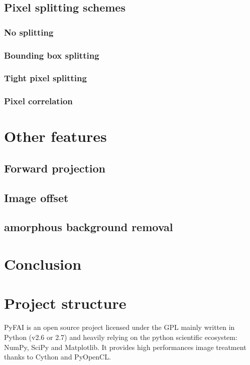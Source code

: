\documentclass[preprint]{iucr}
\begin{document}
\subsection{Pixel splitting schemes}
\subsubsection{No splitting}
\subsubsection{Bounding box splitting}
\subsubsection{Tight pixel splitting}
\subsubsection{Pixel correlation}

\section{Other features}
\subsection{Forward projection}
\subsection{Image offset}
\subsection{amorphous background removal}

\section{Conclusion}






\appendix
\section{Project structure}
PyFAI is an open source project licensed under the GPL mainly written in Python (v2.6 or 2.7) 
and heavily relying on the python scientific ecosystem: NumPy, SciPy and Matplotlib. 
It provides high performances image treatment thanks to Cython and PyOpenCL.
\end{document}
